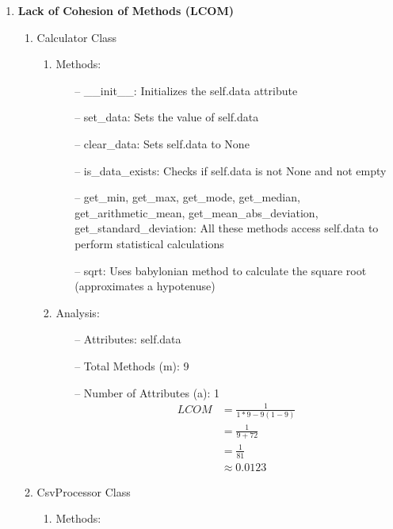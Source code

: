 \begin{enumerate}
\item\textbf{Lack of Cohesion of Methods (LCOM)}
\begin{enumerate}
    \item Calculator Class\\
    \begin{enumerate}
        \item Methods:
        \begin{enumerate}
            \item[--] \_\_init\_\_: Initializes the self.data attribute
            \item[--] set\_data: Sets the value of self.data
            \item[--] clear\_data: Sets self.data to None
            \item[--] is\_data\_exists: Checks if self.data is not None and not empty
            \item[--] get\_min, get\_max, get\_mode, get\_median, get\_arithmetic\_mean, get\_mean\_abs\_deviation, get\_standard\_deviation: All these methods access self.data to perform statistical calculations
            \item[--] sqrt: Uses babylonian method to calculate the square root (approximates a hypotenuse)
        \end{enumerate}
        \item Analysis:
        \begin{enumerate}
            \item[--] Attributes: self.data
            \item[--] Total Methods (m): 9
            \item[--] Number of Attributes (a): 1
            \begin{align}
                LCOM    &= \frac{1}{1*9 - 9(1-9)} \\        
                        &= \frac{1}{9+72} \\  
                        &= \frac{1}{81} \\
                        &\approx	 0.0123
            \end{align}
        \end{enumerate}
    \end{enumerate}
    \item CsvProcessor Class\\
    \begin{enumerate}
        \item Methods:
        \begin{enumerate}

\end{enumerate}
\end{enumerate}
\end{enumerate}
\end{enumerate}
